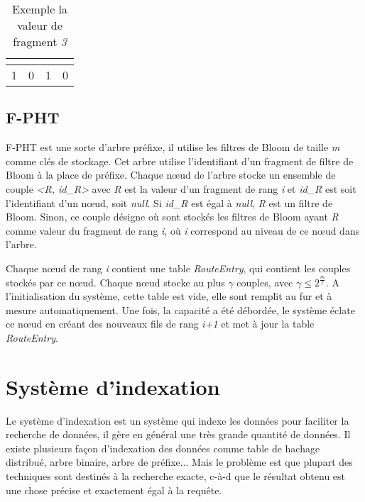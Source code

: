\documentclass[a4paper,11pt]{report}
\begin{document}
	\begin{table}[!h]
		\centering
		\begin{tabular}{|l|c|c|r|}
		\multicolumn{1}{c}{}&\multicolumn{1}{c}{}&\multicolumn{1}{c}{}\\
		\hline
			1 & 0 & 1 & 0 \\
		\hline
		\end{tabular}
		\caption{Exemple la valeur de fragment \textit{3}}
		\label{fragement/exemple2}
	\end{table}
	
\section{F-PHT}
	F-PHT est une sorte d'arbre préfixe, il utilise  les filtres de Bloom  de taille \textit{m} comme clés de stockage. Cet arbre utilise l'identifiant d'un fragment de filtre de Bloom à la place de préfixe. Chaque nœud de l'arbre stocke un ensemble de couple \textit{<R, id\_R>} avec \textit{R} est la valeur d'un fragment de rang \textit{i} et \textit{id\_R} est soit l'identifiant d'un nœud, soit \textit{null}. Si \textit{id\_R} est égal à \textit{null}, \textit{R} est un filtre de Bloom. Sinon, ce couple désigne où sont stockés les filtres de Bloom ayant \textit{R} comme valeur du fragment de rang \textit{i}, où \textit{i} correspond au niveau de ce nœud dans l'arbre.

	Chaque nœud de rang \textit{i} contient une table \textit{RouteEntry}, qui contient les couples stockés par ce nœud. Chaque nœud stocke au plus $\gamma$ couples, avec $\gamma \leq 2^{\frac{m}{f}}$. A l'initialisation du système, cette table est vide, elle sont remplit au fur et à mesure automatiquement. Une fois, la capacité a été débordée, le système éclate ce nœud en créant des nouveaux fils de rang \textit{i+1} et met à jour la table \textit{RouteEntry}.
	
\chapter{Système d'indexation}
	Le système d'indexation est un système qui indexe les données pour faciliter la recherche de données, il gère en général une très grande quantité de données. Il existe plusieurs façon d'indexation des données comme table de hachage distribué, arbre binaire, arbre de préfixe... Mais le problème est que plupart des techniques sont destinés à la recherche exacte, c-à-d que le résultat obtenu est une chose précise et exactement égal à la requête.
	
\end{document}
